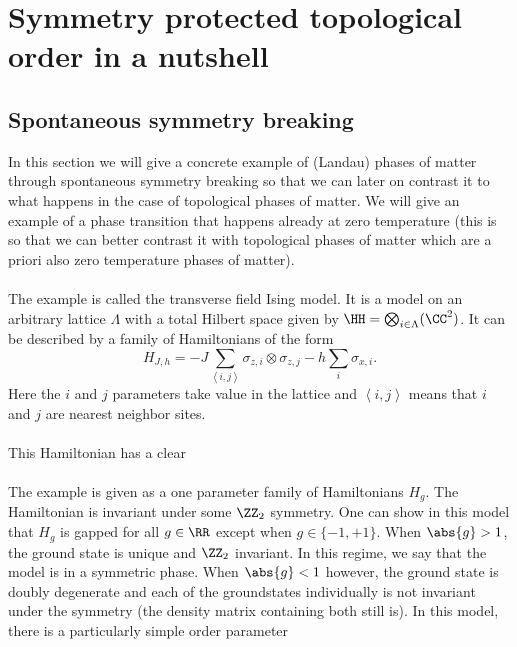 \chapter{Symmetry protected topological order in a nutshell}\label{sec:SPT_Order_In_A_Nutshell}
\section{Spontaneous symmetry breaking}\label{sec:SpontaniousSymmetryBreaking}
In this section we will give a concrete example of (Landau) phases of matter through spontaneous symmetry breaking so that we can later on contrast it to what happens in the case of topological phases of matter. We will give an example of a phase transition that happens already at zero temperature (this is so that we can better contrast it with  topological phases of matter which are a priori also zero temperature phases of matter).
\\\\
The example is called the transverse field Ising model. It is a model on an arbitrary lattice $\Lambda$ with a total Hilbert space given by $\HH=\bigotimes_{i\in\Lambda}(\CC^2)$. It can be described by a family of Hamiltonians of the form
\begin{equation}
	H_{J,h}=-J\sum_{\left<i,j\right>}\sigma_{z,i}\otimes\sigma_{z,j}-h\sum_{i}\sigma_{x,i}.
\end{equation}
Here the $i$ and $j$ parameters take value in the lattice and $\left<i,j\right>$ means that $i$ and $j$ are nearest neighbor sites.
\\\\
This Hamiltonian has a clear 
\\\\
 The example is given as a one parameter family of Hamiltonians $H_g$. The Hamiltonian is invariant under some $\ZZ_2$ symmetry. One can show in this model that $H_g$ is gapped for all $g\in\RR$ except when $g\in\{-1,+1\}$. When $\abs{g}>1$, the ground state is unique and $\ZZ_2$ invariant. In this regime, we say that the model is in a symmetric phase. When $\abs{g}<1$ however, the ground state is doubly degenerate and each of the groundstates individually is not invariant under the symmetry (the density matrix containing both still is). In this model, there is a particularly simple order parameter
\\\\

